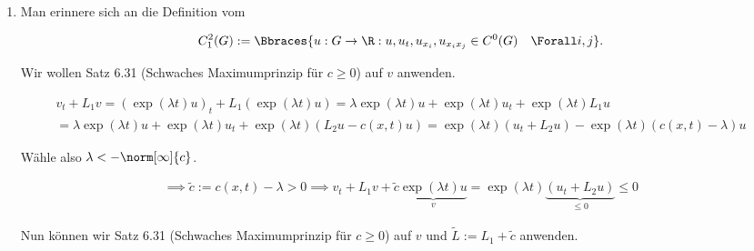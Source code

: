 
\begin{solution}

\phantom{}

\begin{enumerate}[label = (\roman*)]

  \item Man erinnere sich an die Definition vom
  
  \begin{align*}
    C_1^2(G)
    :=
    \Bbraces
    {
      u:
      G \to \R:
      u, u_t, u_{x_i}, u_{x_i x_j} \in C^0(G)
      \quad
      \Forall i, j
    }.
  \end{align*}

  Wir wollen Satz 6.31 (Schwaches Maximumprinzip für $c \geq 0$) auf $v$ anwenden.


  \begin{multline*}
    v_t + L_1 v
    =
    (\exp(\lambda t) u)_t + L_1 (\exp(\lambda t) u)
    =
    \lambda \exp(\lambda t) u + \exp(\lambda t) u_t
    +
    \exp(\lambda t) L_1 u \\
    =
    \lambda \exp(\lambda t) u + \exp(\lambda t) u_t
    +
    \exp(\lambda t) (L_2 u - c(x, t) u)
    =
    \exp(\lambda t) (u_t +  L_2 u)
    -
    \exp(\lambda t) (c(x, t) - \lambda) u
  \end{multline*}

  Wähle also $\lambda < -\norm[\infty]{c}$.

  \begin{align*}
    \implies
    \tilde{c} := c(x, t) - \lambda > 0
    \implies
    v_t + L_1 v + \tilde{c} \underbrace{\exp(\lambda t) u}_v
    =
    \exp(\lambda t)
    \underbrace
    {
      (u_t +  L_2 u)
    }_{
      \leq 0
    }
    \leq
    0
  \end{align*}

  Nun können wir Satz 6.31 (Schwaches Maximumprinzip für $c \geq 0$) auf $v$ und $\tilde{L} := L_1 + \tilde{c}$ anwenden.


\end{enumerate}
\end{solution}
